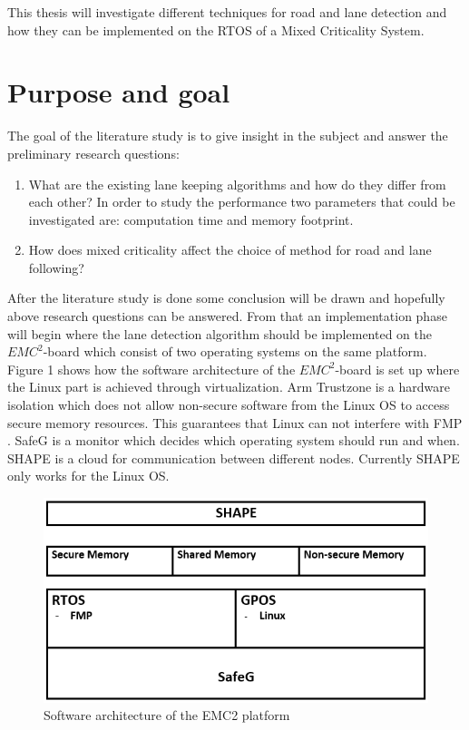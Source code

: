 This thesis will investigate different techniques for road and lane detection and how they can be implemented on the RTOS of a Mixed Criticality System. 


\section{Purpose and goal}
The goal of the literature study is to give insight in the subject and answer the preliminary research questions:
\begin{enumerate}  
\item What are the existing lane keeping algorithms and how do they differ from each other? In order to study the performance two parameters that could be investigated are: computation time and memory footprint.
\item How does mixed criticality affect the choice of method for road and lane following?
\end{enumerate}

After the literature study is done some conclusion will be drawn and hopefully above research questions can be answered. From that an implementation phase will begin where the lane detection algorithm should be implemented on the $EMC^2$-board which consist of two operating systems on the same platform. Figure 1 shows how the software architecture of the $EMC^2$-board is set up where the Linux part is achieved through virtualization. Arm Trustzone is a hardware isolation which does not allow non-secure software from the Linux OS to access secure memory resources. This guarantees that Linux can not interfere with FMP \cite{zaki2016embedded}. SafeG is a monitor which decides which operating system should run and when. SHAPE is a cloud for communication between different nodes. Currently SHAPE only works for the Linux OS.


\begin{figure}[H]
  \includegraphics[scale=1]{./img/architecture.png}
  \centering
  \caption{Software architecture of the EMC2 platform}
  \label{fig:Software architecture of the EMC2 platform}
\end{figure}

